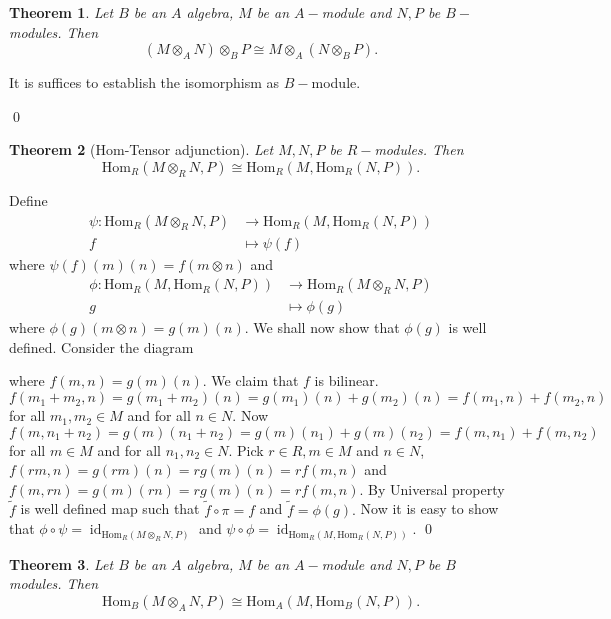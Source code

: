 \documentclass[11pt]{amsart}
\newtheorem{theorem}{Theorem}[section]
\newcommand{\Homa}[1]{\text{Hom}_A\left(#1\right)}
\newcommand{\Homb}[1]{\text{Hom}_B\left(#1\right)}
\newcommand{\Hom}[1]{\text{Hom}_R\left(#1\right)}
\DeclareMathOperator{\id}{\text{id}}
\begin{document}
\begin{theorem}
Let $B$ be an $A$ algebra, $M$ be an $A-$module and $N,P$ be $B-$modules. Then $$(M\otimes_A N)\otimes_B P\cong M\otimes_A(N\otimes_B P).$$
\end{theorem}

\proof It is suffices to establish the isomorphism as $B-$module.

\qed

\begin{theorem}[Hom-Tensor adjunction]
Let $M,N,P$ be $R-$modules. Then $$\Hom{M\otimes_RN,P}\cong \Hom{M,\Hom{N,P}}.$$
\end{theorem}

\proof Define \begin{align*}
\psi:\Hom{M\otimes_RN,P}&\to \Hom{M,\Hom{N,P}}\\
f&\mapsto \psi(f)
\end{align*}
where $\psi(f)(m)(n)=f(m\otimes n)$ and \begin{align*}
\phi:\Hom{M,\Hom{N,P}}&\to \Hom{M\otimes_RN,P}\\
g&\mapsto \phi(g)
\end{align*}
where $\phi(g)(m\otimes n)=g(m)(n).$ We shall now show that $\phi(g)$ is well defined. Consider the diagram 

\begin{center}
\end{center}

where $f(m,n)=g(m)(n)$. We claim that $f$ is bilinear. $f(m_1+m_2,n)=g(m_1+m_2)(n)=g(m_1)(n)+g(m_2)(n)=f(m_1,n)+f(m_2,n)$ for all $m_1,m_2\in M$ and for all $n\in N.$ Now $f(m,n_1+n_2)=g(m)(n_1+n_2)=g(m)(n_1)+g(m)(n_2)=f(m,n_1)+f(m,n_2)$ for all $m\in M$ and for all $n_1,n_2\in N.$ Pick $r\in R,m\in M$ and $n\in N$, $f(rm,n)=g(rm)(n)=rg(m)(n)=rf(m,n)$ and $f(m,rn)=g(m)(rn)=rg(m)(n)=rf(m,n).$ By Universal property $\tilde{f}$ is well defined map such that $\tilde{f}\circ \pi=f$ and $\tilde{f}=\phi(g).$ Now it is easy to show that $\phi\circ \psi=\id_{\Hom{M\otimes_RN,P}}$ and $\psi\circ \phi=\id_{\Hom{M,\Hom{N,P}}}.$ \qed

\begin{theorem}
Let $B$ be an $A$ algebra, $M$ be an $A-$module and $N,P$ be $B$ modules. Then $$\Homb{M\otimes_A N,P}\cong \Homa{M,\Homb{N,P}}.$$
\end{theorem}
\end{document}
